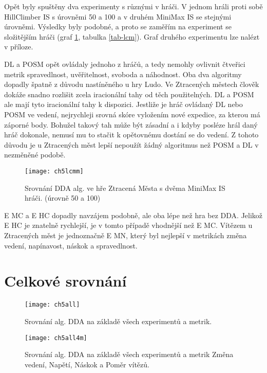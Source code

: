 Opět byly spuštěny dva experimenty s různými v hráči. V jednom hráli proti sobě HillClimber IS s úrovněmi 50 a 100 a v druhém MiniMax IS se stejnými úrovněmi. Výsledky byly podobné, a proto se zaměřím na experiment se složitějším hráči (graf \ref{fig-ch5lcmm}, tabulka \ref{tab-lcm}). Graf druhého experimentu lze nalézt v příloze.

DL a POSM opět ovládaly jednoho z hráčů, a tedy nemohly ovlivnit čtveřici metrik spravedlnost, uvěřitelnost, svoboda a náhodnost. Oba dva algoritmy dopadly špatně z důvodu nastíněného u hry Ludo. Ve Ztracených městech člověk dokáže snadno rozlišit zcela iracionální tahy od těch použitelných. DL a POSM ale mají tyto iracionální tahy k dispozici. Jestliže je hráč ovládaný DL nebo POSM ve vedení, nejrychleji srovná skóre vyložením nové expedice, za kterou má záporné body. Bohužel takový tah může být zásadní a i kdyby posléze hrál daný hráč dokonale, nemusí mu to stačit k opětovnému dostání se do vedení. Z tohoto důvodu je u Ztracených měst lepší nepoužít žádný algoritmus než POSM a DL v nezměněné podobě.

\begin{figure}
  \centering
  \texttt{[image: ch5lcmm]}
	\caption{Srovnání DDA alg. ve hře Ztracená Města s dvěma MiniMax IS hráči. (úrovně 50 a 100)}
	\label{fig-ch5lcmm}
\end{figure}

E MC a E HC dopadly navzájem podobně, ale oba lépe než hra bez DDA. Jelikož E HC je znatelně rychlejší, je v tomto případě vhodnější než E MC. Vítězem u Ztracených měst je jednoznačně E MN, který byl nejlepší v metrikách změna vedení, napínavost, náskok a spravedlnost.

\section{Celkové srovnání}
\begin{figure}
  \centering
  \texttt{[image: ch5all]}
	\caption{ Srovnání alg. DDA na základě všech experimentů a metrik. }
	\label{fig-ch5all}
\end{figure}

\begin{figure}
  \centering
  \texttt{[image: ch5all4m]}
	\caption{ Srovnání alg. DDA na základě všech experimentů a metrik Změna vedení, Napětí, Náskok a Poměr vítězů. }
	\label{fig-ch5all4m}
\end{figure}

\endinput
